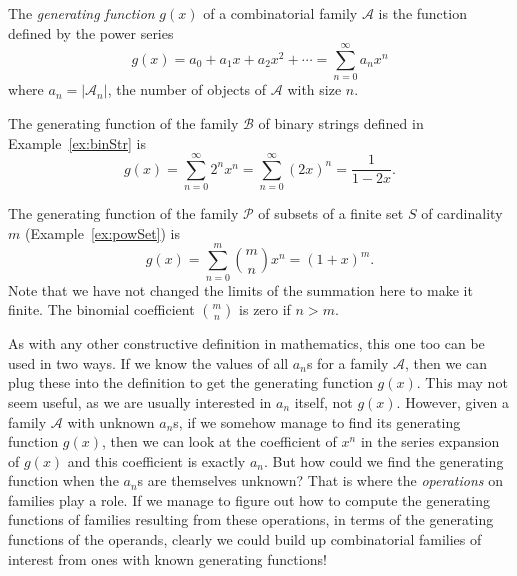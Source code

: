 \documentclass[11pt,a5paper]{amsart}
\newcommand{\cat}{\mathcal}
\begin{document}
\begin{Definition}[label=def:genFun]
The \emph{generating function} $g(x)$ of a combinatorial family $\cat A$ is the function defined by the power series
\begin{equation*}
g(x) = a_0 + a_1 x + a_2 x^2 + \cdots = \sum_{n = 0}^{\infty} a_n x^n
\end{equation*}
where $a_n = |\cat A_n|$, the number of objects of $\cat A$ with size $n$.
\end{Definition}

\begin{Example}
The generating function of the family $\cat B$ of binary strings defined in Example~\ref{ex:binStr} is
\begin{equation*}
g(x) = \sum_{n = 0}^{\infty} 2^n x^n = \sum_{n = 0}^\infty (2x)^n = \dfrac 1 {1 - 2x}.
\end{equation*}
\end{Example}

\begin{Example}[label=ex:powSetGF]
The generating function of the family $\cat P$ of subsets of a finite set $S$ of cardinality $m$ (Example~\ref{ex:powSet}) is
\begin{equation*}
g(x) = \sum_{n = 0}^m \binom m n x^n = (1 + x)^m.
\end{equation*}
Note that we have not changed the limits of the summation here to make it finite. The binomial coefficient $\binom m n$ is zero if $n > m$.
\end{Example}

As with any other constructive definition in mathematics, this one too can be used in two ways. If we know the values of all $a_n$s for a family $\cat A$, then we can plug these into the definition to get the generating function $g(x)$. This may not seem useful, as we are usually interested in $a_n$ itself, not $g(x)$. However, given a family $\cat A$ with unknown $a_n$s, if we somehow manage to find its generating function $g(x)$, then we can look at the coefficient of $x^n$ in the series expansion of $g(x)$ and this coefficient is exactly $a_n$. But how could we find the generating function when the $a_n$s are themselves unknown? That is where the \emph{operations} on families play a role. If we manage to figure out how to compute the generating functions of families resulting from these operations, in terms of the generating functions of the operands, clearly we could build up combinatorial families of interest from	 ones with known generating functions!
\end{document}

